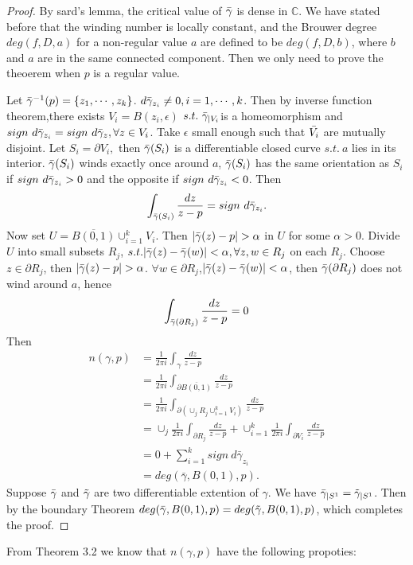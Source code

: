 \documentclass[11pt]{article}
\numberwithin{equation}{section} \numberwithin{theorem}{section}
\numberwithin{lemma}{section} \numberwithin{remark}{section}
\numberwithin{table}{section} \numberwithin{corollary}{section}
\numberwithin{example}{section} \numberwithin{conjecture}{section}
\numberwithin{assumption}{section}
\numberwithin{definition}{section}
\numberwithin{proposition}{section}
\begin{document}
\begin{proof}
    By sard's lemma, the critical value of $\Bar{\gamma}$ is dense in $\mathbb{C}$. We have stated before that the winding number is locally constant, and the Brouwer degree $deg(f,D,a)$ for a non-regular value $a$ are  defined to be $deg(f,D,b)$, where $ b $ and $ a  $ are in the same connected component. Then we only need to prove the theoerem when $p$ is a regular value.
    
    Let $\Bar{\gamma}^{-1}(p)={\{z_1,\cdots ,z_k\}}$. $d\Bar{\gamma}_{z_i}\neq 0,i=1, \cdots ,k$. Then by inverse function theorem,there exists $V_i=B(z_i,\epsilon)$ $s.t.\  \Bar{\gamma}_{|V_i} $is a homeomorphism and $sign\  d\Bar{\gamma}_{z_i}=sign\  d\Bar{\gamma}_{z},\forall z\in V_i$. Take $\epsilon$ small enough such that $\Bar{V_i}$ are mutually disjoint. Let $S_i= \partial V_i,$ then $\Bar{\gamma}(S_i)$ is a differentiable closed curve $s.t.\  a$ lies in its interior. $\Bar{\gamma}(S_i)$   winds exactly once around $a$, $\Bar{\gamma}(S_i)$ has the same orientation as $S_i$ if $sign \ d\Bar{\gamma}_{z_i}>0$ and the opposite if $sign \ d\Bar{\gamma}_{z_i}<0$.   Then 
    \begin{equation}
        \int_{\Bar{\gamma}(S_i)} \frac{dz}{z-p}= sign \ d\Bar{\gamma}_{z_i}.
    \end{equation}
    Now set $U=\overline{B(0,1)} \cup_{i=1}^k V_i$. Then $|\Bar{\gamma}(z)-p|>\alpha$ in $U$ for some $\alpha>0 $. Divide $U$ into small subsets $R_j$, $s.t. |\Bar{\gamma}(z)-\Bar{\gamma}(w)|<\alpha,\forall z,w \in R_j$ on each $R_j$.
    Choose $z\in \partial R_j$, then $|\Bar{\gamma}(z)-p|>\alpha$. $\forall w\in \partial R_j$,$ |\Bar{\gamma}(z)-\Bar{\gamma}(w)|<\alpha$, then $\Bar{\gamma}(\partial R_j)$ does not wind around $a$, hence
    \begin{equation}
         \int_{\Bar{\gamma}(\partial R_j)} \frac{dz}{z-p}=0
    \end{equation}
    Then
\begin{align*}
    n(\gamma,p)&=\frac{1}{2\pi i} \int_{\gamma} \frac{dz}{z-p} \\
    &=\frac{1}{2\pi i} \int_{\partial\overline{B(0,1)}} \frac{dz}{z-p}\\
     &=\frac{1}{2\pi i} \int_{\partial ( \cup_j R_j \cup_{i=1}^k V_i )} \frac{dz}{z-p}\\
     &= \cup_j \frac{1}{2\pi i} \int_{\partial R_j} \frac{dz}{z-p} +\cup_{i=1}^k \frac{1}{2\pi i} \int_{\partial V_i} \frac{dz}{z-p} \\
     &= 0+ \sum_{i=1}^k sign\ d\bar{\gamma}_{z_i}\\
     &=deg(\bar{\gamma},B(0,1),p).
\end{align*}
Suppose $\Bar{\gamma}$ and $\Tilde{\gamma}$ are two differentiable extention of $\gamma$. We have $\Bar{\gamma}_{|S^1}=\Tilde{\gamma}_{|S^1}$. Then by the boundary Theorem $deg(\Bar{\gamma},B(0,1),p)=deg(\Tilde{\gamma},B(0,1),p)$, which completes the proof.
\end{proof}
From Theorem 3.2 we know that $n(\gamma,p)$ have the following propoties:
\end{document}

